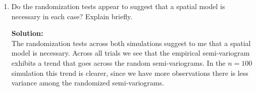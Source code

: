 \documentclass[12pt]{article}
\makeatletter
\theoremstyle{homework}
\newenvironment{exercise}[1]
{\def\@currentlabel{#1}\exercisecore}
{\endexercisecore}
\newcommand{\localhead}[1]{\par\smallskip\noindent\textbf{#1}\nobreak\\}%
\newcommand\solution{\localhead{Solution:}}
\makeatother
\begin{document}
\begin{exercise}{5}
\begin{enumerate}
  
  
  
  
  \item
  Do the randomization tests appear to suggest that a spatial model is necessary in each case? 
  Explain briefly.\\
  \solution The randomization tests across both simulations suggest to me that a spatial model is necessary. Across all trials we see that 
  the empirical semi-variogram exhibits a trend that goes across the random semi-variograms. In the $n = 100$ simulation this trend is clearer, since we have more 
  observations there is less variance among the randomized semi-variograms.
  \end{enumerate}
  
\end{exercise}
\end{document}
